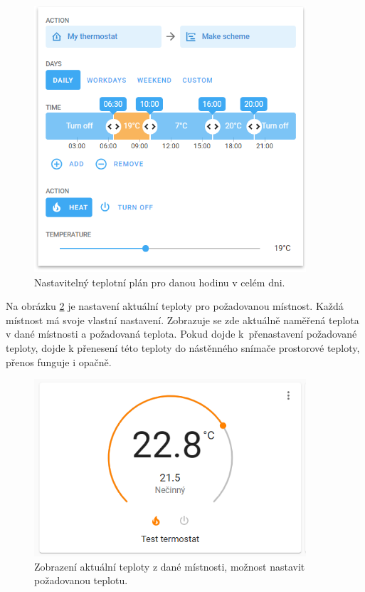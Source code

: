 \begin{figure}[H]
    \centering
    \includegraphics[width=0.90\textwidth]{images/software-ha/teplotni-plan.png}
    \caption{Nastavitelný teplotní plán pro danou hodinu v celém dni.}
    \label{fig:teplotni-plan}
\end{figure}

Na obrázku \ref{fig:termostat-v-mistnosti} je nastavení aktuální teploty pro požadovanou místnost. Každá místnost má svoje vlastní nastavení. Zobrazuje se zde aktuálně naměřená teplota v dané místnosti a požadovaná teplota. Pokud dojde k~přenastavení požadované teploty, dojde k přenesení této teploty do nástěnného snímače prostorové teploty, přenos funguje i opačně.

\begin{figure}[H]
    \centering
    \includegraphics[width=0.90\textwidth]{images/software-ha/termostat-v-mistnosti.png}
    \caption{Zobrazení aktuální teploty z dané místnosti, možnost nastavit požadovanou teplotu.}
    \label{fig:termostat-v-mistnosti}
\end{figure}


